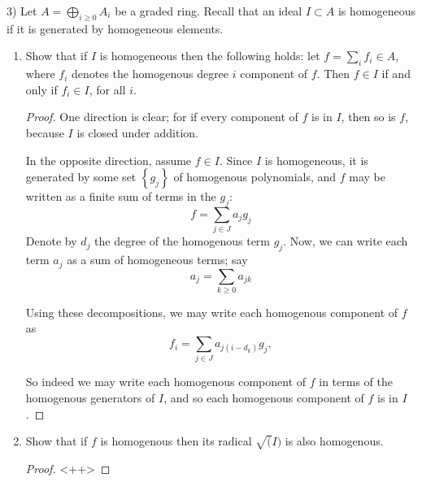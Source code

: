 \documentclass[12pt]{article}
\theoremstyle{definition}
\newenvironment{problem}[2][Problem]{\begin{trivlist}
\item[\hskip \labelsep {\bfseries #1}\hskip \labelsep {\bfseries #2.}]}{\end{trivlist}}
\begin{document}
\begin{problem}(3)
    Let $A = \bigoplus_{i \geq 0} A_i$ be a graded ring. Recall that an ideal $I\subset A$ is homogeneous if it is generated by homogeneous elements. 
    \begin{enumerate}[label=(\alph*)]
        \item Show that if $I$ is homogeneous then the following holds: let $f=\sum_i f_i \in A$, where $f_i$ denotes the homogenous degree $i$ component of $f$. Then $f \in I$ if and only if $f_i \in I$, for all $i$.
            \begin{proof}
                One direction is clear; for if every component of $f$ is in $I$, then so is $f$, because $I$ is closed under addition. 
                \par In the opposite direction, assume $f \in I$. Since $I$ is homogeneous, it is generated by some set $\left\{ g_j \right\}$ of homogenous polynomials, and $f$ may be written as a finite sum of terms in the $g_j$:
                \[f = \sum_{j \in J} a_j g_j\]
                Denote by $d_j$ the degree of the homogenous term $g_j$. Now, we can write each term $a_j$ as a sum of homogeneous terms; say
                \[a_j = \sum_{k \geq 0} a_{jk}\]
                \par Using these decompositions, we may write each homogenous component of $f$ as\[ f_i = \sum_{j \in J} a_{j(i -d_k)} g_j,\]
                \par So indeed we may write each homogenous component of $f$ in terms of the homogenous generators of $I$, and so each homogenous component of $f$ is in $I$.
            \end{proof}
        \item Show that if $f$ is homogenous then its radical $\sqrt(I)$ is also homogenous.
             \begin{proof}
                 <++>
             \end{proof}
    \end{enumerate}
\end{problem}
\end{document}
